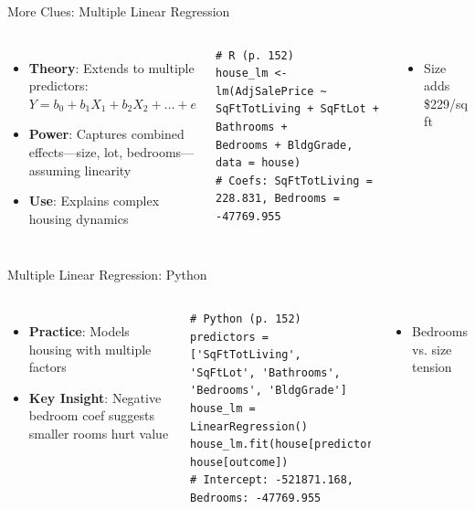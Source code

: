 \documentclass{beamer}
\begin{document}
	\begin{frame}[fragile]{More Clues: Multiple Linear Regression}
		\begin{columns}
			\begin{itemize}
				\item \textbf{Theory}: Extends to multiple predictors: $Y = b_0 + b_1X_1 + b_2X_2 + \dots + e$
				\item \textbf{Power}: Captures combined effects—size, lot, bedrooms—assuming linearity
				\item \textbf{Use}: Explains complex housing dynamics
			\end{itemize}
			\begin{lstlisting}
# R (p. 152)
house_lm <- lm(AdjSalePrice ~ SqFtTotLiving + SqFtLot + Bathrooms +
Bedrooms + BldgGrade, data = house)
# Coefs: SqFtTotLiving = 228.831, Bedrooms = -47769.955
			\end{lstlisting}
			\begin{itemize}
				\item Size adds \$229/sq ft
			\end{itemize}
		\end{columns}
	\end{frame}
	
	\begin{frame}[fragile]{Multiple Linear Regression: Python}
		\lstset{language=Python}
		\begin{columns}
			\column{0.6\textwidth}
			\begin{itemize}
				\item \textbf{Practice}: Models housing with multiple factors
				\item \textbf{Key Insight}: Negative bedroom coef suggests smaller rooms hurt value
			\end{itemize}
			\begin{lstlisting}
# Python (p. 152)
predictors = ['SqFtTotLiving', 'SqFtLot', 'Bathrooms', 'Bedrooms', 'BldgGrade']
house_lm = LinearRegression()
house_lm.fit(house[predictors], house[outcome])
# Intercept: -521871.168, Bedrooms: -47769.955
			\end{lstlisting}
			\column{0.4\textwidth}
			\begin{itemize}
				\item Bedrooms vs. size tension
			\end{itemize}
		\end{columns}
	\end{frame}
	
\end{document}
